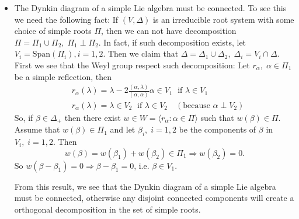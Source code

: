 \begin{itemize}
\item The Dynkin diagram of a simple Lie algebra must be connected. To see this we need the following fact: If 
$(V,\Delta)$ is an irreducible root system with some choice of simple roots $\Pi$, then we can not have decomposition 
$\Pi=\Pi_1\cup\Pi_2,\;\Pi_1\perp\Pi_2$. In fact, if such decomposition exists, let $V_i=\text{Span}(\Pi_i),i=1,2$. Then we 
claim that $\Delta=\Delta_1\cup \Delta_2,\;\Delta_i=V_i\cap \Delta$. First we see that the Weyl group respect such 
decomposition: Let $r_\alpha,\;\alpha\in\Pi_1$ be a simple reflection, then 
\begin{equation}
    \begin{split}
        &r_\alpha(\lambda)=\lambda-2\frac{(\alpha,\lambda)}{(\alpha,\alpha)}\alpha\in V_1\;\text{ if }\lambda\in V_1\\
        &r_\alpha(\lambda)=\lambda\in V_2\;\text{ if }\lambda\in V_2\quad(\text{because }\alpha\perp V_2)
    \end{split}
\end{equation}
So, if $\beta\in \Delta_+$ then there exist $w\in W=\langle r_\alpha:\alpha\in\Pi\rangle$ such that $w(\beta)\in \Pi$. Assume that $w(\beta)\in\Pi_1$ and let 
$\beta_i,\;i=1,2$ be the components of $\beta$ in $V_i,\;i=1,2$. Then 
\begin{equation}
    w(\beta)=w(\beta_1)+w(\beta_2)\in \Pi_1\Rightarrow w(\beta_2)=0.
\end{equation}
So $w(\beta-\beta_1)=0\Rightarrow \beta-\beta_1=0$, i.e. $\beta\in V_1$.\par 

From this result, we see that the Dynkin diagram of a simple Lie algebra must be connected, otherwise any disjoint connected components
will create a orthogonal decomposition in the set of simple roots.


\end{itemize}
